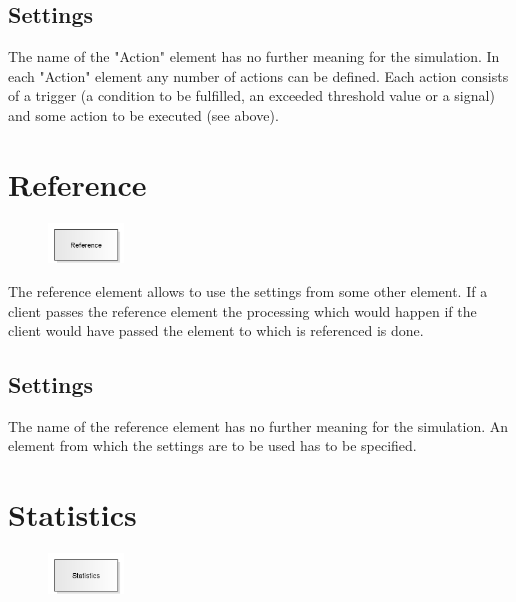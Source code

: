 \subsection*{Settings}

The name of the "Action" element has no further meaning for the simulation.
In each "Action" element any number of actions can be defined. Each action
consists of a trigger (a condition to be fulfilled, an exceeded threshold value or a signal)
and some action to be executed (see above).


\section{Reference}
\label{ref:ModelElementReference}

\begin{figure}
\vspace{-22pt}
\includegraphics[width=2cm]{imageModelElementReference.png}
\vspace{-22pt}
\end{figure}

The reference element allows to use the settings from some other element.
If a client passes the reference element the processing which would happen
if the client would have passed the element to which is referenced is done.

\subsection*{Settings}

The name of the reference element has no further meaning for the simulation.
An element from which the settings are to be used has to be specified.


\section{Statistics}
\label{ref:ModelElementUserStatistic}

\begin{figure}
\vspace{-22pt}
\includegraphics[width=2cm]{imageModelElementUserStatistic.png}
\vspace{-22pt}
\end{figure}


